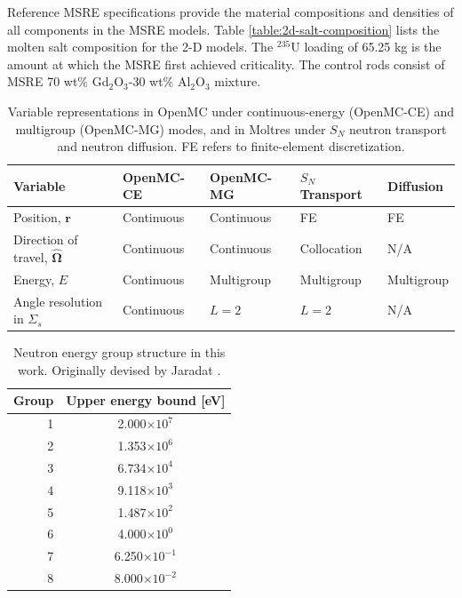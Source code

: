 Reference \gls{MSRE} specifications \cite{robertsonMSREDESIGNOPERATIONS1965b, fratoni_molten_2020} provide the
material compositions and densities of all components in the \gls{MSRE} models.
Table \ref{table:2d-salt-composition} lists the molten salt composition for the 2-D models. The
$^{235}$U loading of 65.25 kg is the amount at which the \gls{MSRE} first achieved criticality. The
control rods consist of \gls{MSRE} 70 wt\% Gd$_2$O$_3$-30 wt\% Al$_2$O$_3$ mixture.
%
\begin{table}[!t]
  \centering
  \footnotesize
  \caption{Variable representations in OpenMC under continuous-energy (OpenMC-CE) and multigroup
  (OpenMC-MG) modes, and in Moltres under $S_N$ neutron transport and neutron diffusion. FE refers to
  finite-element discretization.}
  \begin{tabular}{l l l l l}
    \toprule
    Variable & OpenMC-CE & OpenMC-MG & $S_N$ Transport & Diffusion \\
    \midrule
    Position, $\bm{r}$ & Continuous & Continuous & FE & FE \\
    Direction of travel, $\bm{\hat{\Omega}}$ & Continuous & Continuous & Collocation & N/A \\
    Energy, $E$ & Continuous & Multigroup & Multigroup & Multigroup \\
    Angle resolution in $\Sigma_s$ & Continuous & $L=2$ & $L=2$ & N/A \\
    \bottomrule
  \end{tabular}
  \label{table:var}
\end{table}
%
\begin{table}[!t]
  \centering
  \caption{Neutron energy group structure in this work. Originally devised by Jaradat
  \cite{jaradat_development_2021}.}
  \begin{tabular}{r S}
    \toprule
    Group & {Upper energy bound [eV]} \\
     & 2.000$\times 10^7$ \\
    2 & 1.353$\times 10^6$ \\
    3 & 6.734$\times 10^4$ \\
    4 & 9.118$\times 10^3$ \\
    5 & 1.487$\times 10^2$ \\
    6 & 4.000$\times 10^0$ \\
    7 & 6.250$\times 10^{-1}$ \\
    8 & 8.000$\times 10^{-2}$ \\
    \bottomrule
  \end{tabular}
  \label{table:energy-group}
\end{table}
